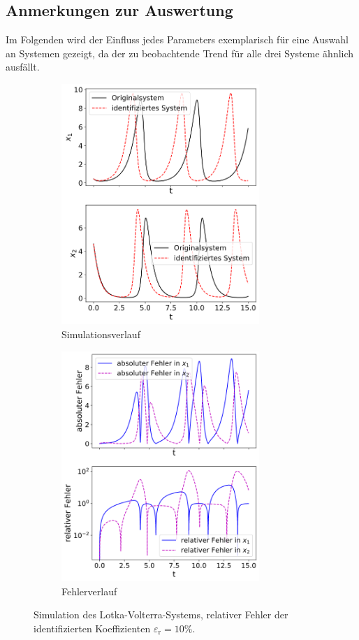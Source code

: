 \subsection{Anmerkungen zur Auswertung}
Im Folgenden wird der Einfluss jedes Parameters exemplarisch für eine Auswahl an Systemen gezeigt, da der zu beobachtende Trend für alle drei Systeme ähnlich ausfällt.

\begin{figure}[hb] %
	\centering
	\begin{subfigure}{0.5\textwidth}
	  \centering
	  \includegraphics[width=75mm]{images/sim_volterra_e_0_1_sim.png}
	  \caption{Simulationsverlauf}
	  \label{fig:sim_volterra_e_0.1_sim}
	\end{subfigure}%
	\begin{subfigure}{.5\textwidth}
	  \centering
	  \includegraphics[width=75mm]{images/sim_volterra_e_0_1_err.png}
	  \caption{Fehlerverlauf}
	  \label{fig:sim_volterra_e_0.1_err}
	\end{subfigure}
	\caption{Simulation des Lotka-Volterra-Systems, relativer Fehler der identifizierten Koeffizienten $\varepsilon_\text{r} = 10 \%. $ }
	\label{fig:sim_volterra_e_0.1}
\end{figure}
